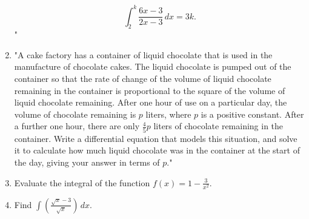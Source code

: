 \documentclass{article}
\begin{document}
\begin{enumerate}
\[
\int_{2}^{k} \frac{6x - 3}{2x - 3} \, dx = 3k.
\]"
\vspace{3cm}
\item "A cake factory has a container of liquid chocolate that is used in the manufacture of chocolate cakes. The liquid chocolate is pumped out of the container so that the rate of change of the volume of liquid chocolate remaining in the container is proportional to the square of the volume of liquid chocolate remaining. After one hour of use on a particular day, the volume of chocolate remaining is \( p \) liters, where \( p \) is a positive constant. After a further one hour, there are only \( \frac{4}{5} p \) liters of chocolate remaining in the container. Write a differential equation that models this situation, and solve it to calculate how much liquid chocolate was in the container at the start of the day, giving your answer in terms of \( p \)."
\vspace{3cm}
\item Evaluate the integral of the function \( f(x) = 1 - \frac{3}{x^2} \).
\vspace{3cm}
\item Find \(\int \left( \frac{\sqrt{x} - 3}{\sqrt{x}} \right) \, dx\).
\vspace{3cm}

\end{enumerate}
\end{document}
